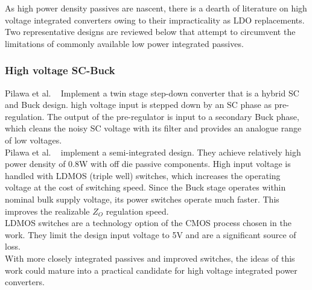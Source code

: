 \documentclass[letterpaper,twocolumn,10pt]{article}
\begin{document}
\indent As high power density passives are nascent, there is a dearth of literature on high voltage integrated converters owing to their impracticality as LDO replacements. Two representative designs are reviewed below that attempt to circumvent the limitations of commonly available low power integrated passives.\\
\subsubsection{High voltage SC-Buck }
Pilawa et al. ~\cite{Pilawa2012} Implement a twin stage step-down converter that is a hybrid SC and Buck design. high voltage input is stepped down by an SC phase as pre-regulation. The output of the pre-regulator is input to a secondary Buck phase, which cleans the noisy SC voltage with its filter and provides an analogue range of low voltages.\\
Pilawa et al. ~\cite{Pilawa2012} implement a semi-integrated design. They achieve relatively high power density of 0.8W with off die passive components. High input voltage is handled with LDMOS (triple well) switches, which increases the operating voltage at the cost of switching speed. Since the Buck stage operates within nominal bulk supply voltage, its power switches operate much faster. This improves the realizable $Z_O$ regulation speed.\\
LDMOS switches are a technology option of the CMOS process chosen in the work. They limit the design input voltage to 5V and are a significant source of loss.\\
With more closely integrated passives and improved switches, the ideas of this work could mature into a practical candidate for high voltage integrated power converters.\\
\end{document}
